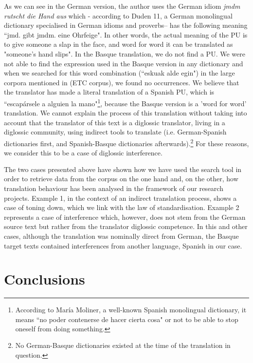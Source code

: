 \documentclass[output=paper]{LSP/langsci}
\begin{document}
As we can see in the German version, the author uses the German idiom \textit{jmdm rutscht die Hand aus} which - according to Duden 11, a German monolingual dictionary specialised in German idioms and proverbs– has the following meaning “jmd. gibt jmdm. eine Ohrfeige". In other words, the actual meaning of the PU is to give someone a slap in the face, and word for word it can be translated as "someone's hand slips". In the Basque translation, we do not find a PU. We were not able to find the expression used in the Basque version in any dictionary and when we searched for this word combination (“eskuak alde egin") in the large corpora mentioned in  (ETC corpus), we found no occurrences. We believe that the translator has made a literal translation of a Spanish PU, which is “escapársele a alguien la mano"\footnote{According to María Moliner, a well-known Spanish monolingual dictionary, it means “no poder contenerse de hacer cierta cosa" or not to be able to stop oneself from doing something.}, because the Basque version is a 'word for word' translation. We cannot explain the process of this translation without taking into account that the translator of this text is a diglossic translator, living in a diglossic community, using indirect tools to translate (i.e. German-Spanish dictionaries first, and Spanish-Basque dictionaries afterwards).\footnote{No German-Basque dictionaries existed at the time of the translation in question.} For these reasons, we consider this to be a case of diglossic interference.

The two cases presented above have shown how we have used the search tool in order to retrieve data from the corpus on the one hand and, on the other, how translation behaviour has been analysed in the framework of our research projects. Example 1, in the context of an indirect translation process, shows a case of toning down, which we link with the law of standardisation. Example 2 represents a case of interference which, however, does not stem from the German source text but rather from the translator diglossic competence. In this and other cases, although the translation was nominally direct from German, the Basque target texts contained interferences from another language, Spanish in our case.

\section{Conclusions}
\end{document}

